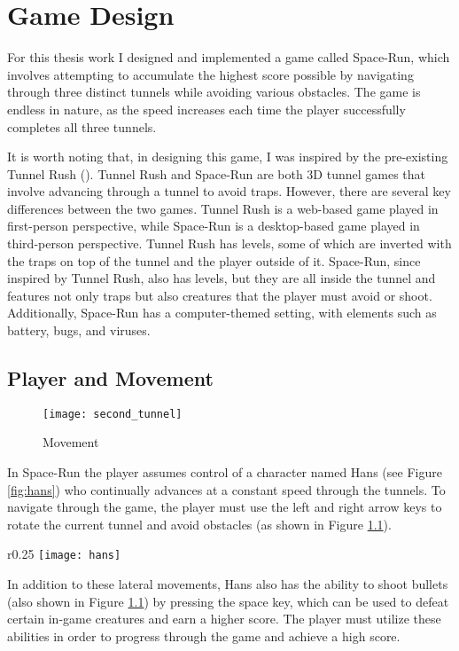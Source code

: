 \chapter{Game Design}
For this thesis work I designed and implemented a game called Space-Run, which involves attempting to accumulate the highest score possible by navigating \\ through three distinct tunnels while avoiding various obstacles. The game is endless in nature, as the speed increases each time the player successfully completes all three tunnels. 

It is worth noting that, in designing this game, I was inspired by the pre-existing Tunnel Rush (\cite{tunnelrush}). Tunnel Rush and Space-Run are both 3D tunnel games that involve advancing through a tunnel to avoid traps. However, there are several key differences between the two games. Tunnel Rush is a web-based game played in first-person perspective, while Space-Run is a desktop-based game played in third-person perspective. Tunnel Rush has levels, some of which are inverted with the traps on top of the tunnel and the player outside of it. Space-Run, since inspired by Tunnel Rush, also has levels, but they are all inside the tunnel and features not only traps but also creatures that the player must avoid or shoot. Additionally, Space-Run has a computer-themed setting, with elements such as battery, bugs, and viruses.

\section{Player and Movement}

\begin{figure}[h]
    \centering
    \texttt{[image: second\_tunnel]}
    \caption{Movement}
    \label{fig:snd_tunnel}
\end{figure}

In Space-Run the player assumes control of a character named Hans (see Figure \ref{fig:hans}) who continually advances at a constant speed through the tunnels. To navigate through the game, the player must use the left and right arrow keys to rotate the current tunnel and avoid obstacles (as shown in Figure \ref{fig:snd_tunnel}). 
\begin{wrapfigure}{r}{0.25\textwidth}
    \centering
    \texttt{[image: hans]}
    \caption{Hans}
    \label{fig:hans}
\end{wrapfigure}
In addition to these lateral movements, Hans also has the ability to shoot bullets (also shown in Figure \ref{fig:snd_tunnel}) by pressing the space key, which can be used to defeat certain in-game creatures and earn a higher score. The player must utilize these abilities in order to progress through the game and achieve a high score.

